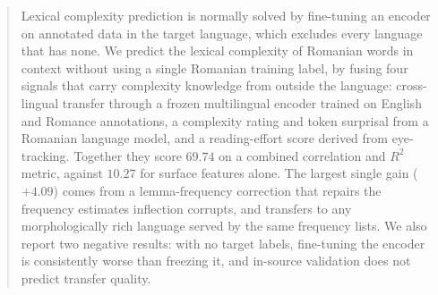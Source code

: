 

\maketitle
\begin{abstract}
Lexical complexity prediction is normally solved by fine-tuning an
encoder on annotated data in the target language, which excludes every
language that has none. We predict the lexical complexity of Romanian
words in context without using a single Romanian training label, by
fusing four signals that carry complexity knowledge from outside the
language: cross-lingual transfer through a frozen multilingual encoder
trained on English and Romance annotations, a complexity rating and
token surprisal from a Romanian language model, and a reading-effort
score derived from eye-tracking. Together they score $69.74$ on a
combined correlation and $R^2$ metric, against $10.27$ for surface
features alone. The largest single gain
($+4.09$) comes from a lemma-frequency correction that repairs the
frequency estimates inflection corrupts, and transfers to any
morphologically rich language served by the same frequency lists. We
also report two negative results: with no target labels, fine-tuning
the encoder is consistently worse than freezing it, and in-source
validation does not predict transfer quality.
\end{abstract}

